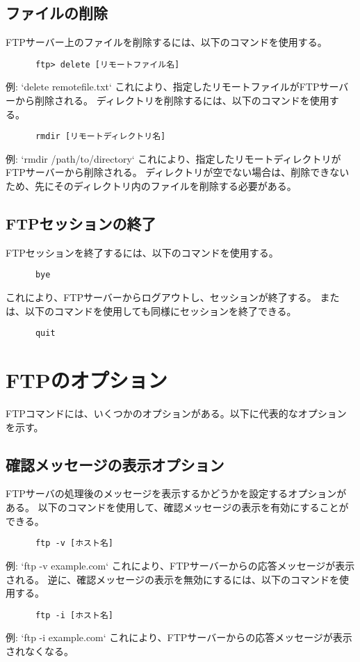 \documentclass[a4paper,10pt]{jsarticle}
\begin{document}
    \subsection{ファイルの削除}
    FTPサーバー上のファイルを削除するには、以下のコマンドを使用する。
    \begin{lstlisting}
      ftp> delete [リモートファイル名]
    \end{lstlisting}
    例: `delete remotefile.txt`
    これにより、指定したリモートファイルがFTPサーバーから削除される。
    ディレクトリを削除するには、以下のコマンドを使用する。
    \begin{lstlisting}
      rmdir [リモートディレクトリ名]
    \end{lstlisting}
    例: `rmdir /path/to/directory`
    これにより、指定したリモートディレクトリがFTPサーバーから削除される。
    ディレクトリが空でない場合は、削除できないため、先にそのディレクトリ内のファイルを削除する必要がある。

    \subsection{FTPセッションの終了}
    FTPセッションを終了するには、以下のコマンドを使用する。
    \begin{lstlisting}
      bye
    \end{lstlisting}
    これにより、FTPサーバーからログアウトし、セッションが終了する。
    または、以下のコマンドを使用しても同様にセッションを終了できる。
    \begin{lstlisting}
      quit
    \end{lstlisting}

\section{FTPのオプション}
    FTPコマンドには、いくつかのオプションがある。以下に代表的なオプションを示す。

    \subsection{確認メッセージの表示オプション}
    FTPサーバの処理後のメッセージを表示するかどうかを設定するオプションがある。
    以下のコマンドを使用して、確認メッセージの表示を有効にすることができる。
    \begin{lstlisting}
      ftp -v [ホスト名]
    \end{lstlisting}
    例: `ftp -v example.com`
    これにより、FTPサーバーからの応答メッセージが表示される。
    逆に、確認メッセージの表示を無効にするには、以下のコマンドを使用する。
    \begin{lstlisting}
      ftp -i [ホスト名]
    \end{lstlisting}
    例: `ftp -i example.com`
    これにより、FTPサーバーからの応答メッセージが表示されなくなる。
\end{document}
